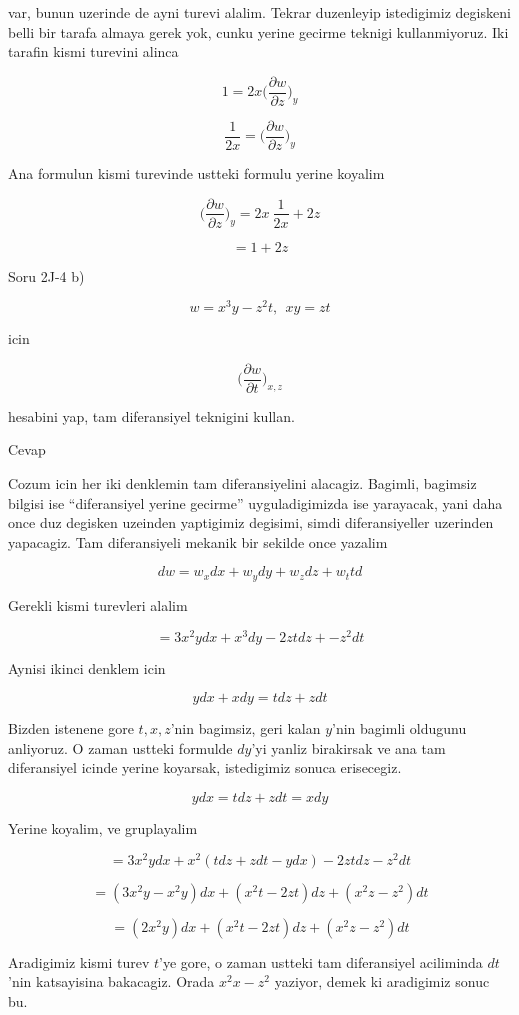 \documentclass[12pt,fleqn]{article}\usepackage{../common}
\begin{document}
var, bunun uzerinde de ayni turevi alalim. Tekrar duzenleyip istedigimiz
degiskeni belli bir tarafa almaya gerek yok, cunku yerine gecirme teknigi
kullanmiyoruz. Iki tarafin kismi turevini alinca

\[ 1 = 2x  \bigg( \frac{\partial w}{\partial z}  \bigg)_y  \]

\[ \frac{ 1}{2x}  = \bigg( \frac{\partial w}{\partial z}  \bigg)_y  \]

Ana formulun kismi turevinde ustteki formulu yerine koyalim

\[  \bigg( \frac{\partial w}{\partial z}  \bigg)_y  =
2x \  \frac{1}{2x}  + 2z
 \]

\[   =
1 + 2z
 \]

Soru 2J-4 b)

\[ w = x^3y - z^2t, \ \ xy = zt\]

icin

\[ \bigg( \frac{\partial w}{\partial t}  \bigg)_{x,z}  \]

hesabini yap, tam diferansiyel teknigini kullan. 

Cevap

Cozum icin her iki denklemin tam diferansiyelini alacagiz. Bagimli,
bagimsiz bilgisi ise ``diferansiyel yerine gecirme'' uyguladigimizda ise
yarayacak, yani daha once duz degisken uzeinden yaptigimiz degisimi, simdi
diferansiyeller uzerinden yapacagiz. Tam diferansiyeli mekanik bir sekilde
once yazalim

\[ dw = w_x dx + w_y dy + w_z dz + w_t td \]

Gerekli kismi turevleri alalim

\[ = 3x^2y dx + x^3dy - 2zt dz + -z^2 dt\]

Aynisi ikinci denklem icin 

\[ y dx + x dy = t dz + z dt \]

Bizden istenene gore $t,x,z$'nin bagimsiz, geri kalan $y$'nin bagimli
oldugunu anliyoruz. O zaman ustteki formulde $dy$'yi yanliz birakirsak ve
ana tam diferansiyel icinde yerine koyarsak, istedigimiz sonuca
erisecegiz. 

\[ y dx  = t dz + z dt = x dy\]

Yerine koyalim, ve gruplayalim

\[ = 3x^2ydx + x^2(tdz + zdt - ydx) - 2ztdz - z^2dt \]

\[ = (3x^2y  - x^2y)dx + (x^2t-2zt)dz + (x^2z-z^2)dt  \]

\[ = (2x^2y) dx + (x^2t-2zt) dz + (x^2z-z^2)dt  \]

Aradigimiz kismi turev $t$'ye gore, o zaman ustteki tam diferansiyel
aciliminda $dt$'nin katsayisina bakacagiz. Orada $x^2x-z^2$ yaziyor, demek
ki aradigimiz sonuc bu. 
\end{document}
